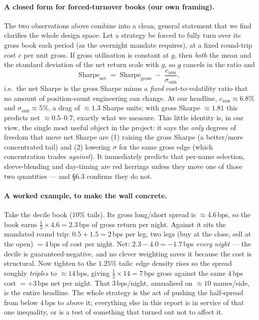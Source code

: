 \documentclass[11pt,a4paper]{article}
\makeatletter
\newcommand{\grossHead}{1.81}                %
\makeatother
\begin{document}
\paragraph{A closed form for forced-turnover books (our own framing).} The two observations above combine into
a clean, general statement that we find clarifies the whole design space. Let a strategy be forced to fully
turn over its gross book each period (as the overnight mandate requires), at a fixed round-trip cost $c$ per
unit gross. If gross utilisation is constant at $g$, then \emph{both} the mean and the standard deviation of the
net return scale with $g$, so $g$ cancels in the ratio and
\[
\text{Sharpe}_{\text{net}} \;=\; \text{Sharpe}_{\text{gross}} \;-\; \frac{c_{\text{ann}}}{\sigma_{\text{ann}}},
\]
i.e.\ the net Sharpe is the gross Sharpe minus a \emph{fixed} cost-to-volatility ratio that no amount of
position-count engineering can change. At our headline, $c_{\text{ann}}\approx6.8\%$ and
$\sigma_{\text{ann}}\approx5\%$, a drag of $\approx1.3$ Sharpe units; with gross Sharpe $\approx\grossHead$ this
predicts net $\approx0.5$--$0.7$, exactly what we measure. This little identity is, in our view, the single most
useful object in the project: it says the \emph{only} degrees of freedom that move net Sharpe are (1) raising the
gross Sharpe (a better/more concentrated tail) and (2) lowering $\sigma$ for the same gross edge (which
concentration trades \emph{against}). It immediately predicts that per-name selection, sleeve-blending and
day-timing are red herrings unless they move one of those two quantities --- and \S6.3 confirms they do not.

\paragraph{A worked example, to make the wall concrete.} Take the decile book ($10\%$ tails). Its
gross long/short spread is $\approx4.6$\,bps, so the book earns $\tfrac12\times4.6=2.3$\,bps of gross return per
night. Against it sits the mandated round trip: $0.5+1.5=2$\,bps per leg, two legs (buy at the close, sell at
the open) $=4$\,bps of cost per night. Net: $2.3-4.0=-1.7$\,bps \emph{every night} --- the decile is
guaranteed-negative, and no clever weighting saves it because the cost is structural. Now tighten to the
$1.25\%$ tails: edge density rises so the spread roughly \emph{triples} to $\approx14$\,bps, giving
$\tfrac12\times14=7$\,bps gross against the same $4$\,bps cost $=+3$\,bps net per night. That $3$\,bps/night,
annualised on $\approx10$ names/side, is the entire headline. The whole strategy is the act of pushing the
half-spread from below $4$\,bps to above it; everything else in this report is in service of that one inequality,
or is a test of something that turned out not to affect it.
\end{document}
